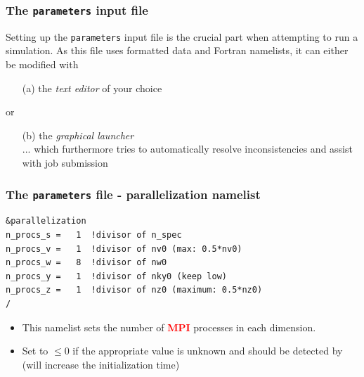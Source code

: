 \documentclass[10pt]{beamer}
\newcommand{\cR}[1]{\textcolor{red}{#1}}
\begin{document}

\begin{frame}[fragile]
   \frametitle{The {\tt parameters} input file}

\begin{exampleblock}{}
Setting up the {\tt parameters} input file is the crucial part when attempting to run a simulation.
As this file uses formatted data and Fortran namelists, it can either be modified with
\begin{itemize}
 \item[(a)] the {\em text editor} of your choice
\end{itemize}
or
\begin{itemize}
 \item[(b)] the {\em graphical launcher}\\
... which furthermore tries to automatically resolve inconsistencies and assist with job submission 
\end{itemize}
\end{exampleblock} 
\end{frame}




\begin{frame}[fragile] %
  \frametitle{The {\tt parameters} file - parallelization namelist}

\begin{block} %

\begin{block}

\begin{verbatim}
&parallelization
n_procs_s =   1  !divisor of n_spec
n_procs_v =   1  !divisor of nv0 (max: 0.5*nv0)
n_procs_w =   8  !divisor of nw0
n_procs_y =   1  !divisor of nky0 (keep low)
n_procs_z =   1  !divisor of nz0 (maximum: 0.5*nz0)
/
\end{verbatim}

\end{block}
\begin{itemize}
\item This namelist sets the number of \cR{\bf MPI} processes in each dimension. 
\item Set to $\leq 0$ if the appropriate value is unknown and should be detected by \gene (will increase the initialization time)
\end{itemize}
\end{block}

\end{frame}
\end{document}
